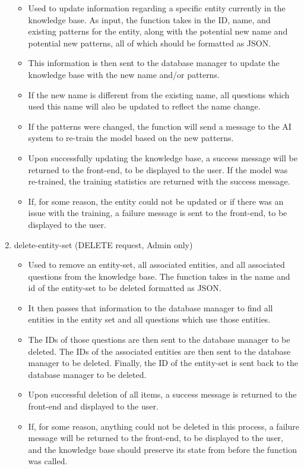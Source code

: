 \documentclass[titlepage, 12pt]{article}
\begin{document}
\begin{enumerate}
    \begin{itemize}
        \item Used to update information regarding a specific entity currently in the knowledge base. As input, the function takes in the ID, name, and existing patterns for the entity, along with the potential new name and potential new patterns, all of which should be formatted as JSON.
        \item This information is then sent to the database manager to update the knowledge base with the new name and/or patterns.
        \item If the new name is different from the existing name, all questions which used this name will also be updated to reflect the name change.
        \item If the patterns were changed, the function will send a message to the AI system to re-train the model based on the new patterns.
        \item Upon successfully updating the knowledge base, a success message will be returned to the front-end, to be displayed to the user. If the model was re-trained, the training statistics are returned with the success message.
        \item If, for some reason, the entity could not be updated or if there was an issue with the training, a failure message is sent to the front-end, to be displayed to the user.
    \end{itemize}
    \item delete-entity-set (DELETE request, Admin only)
    \begin{itemize}
        \item Used to remove an entity-set, all associated entities, and all associated questions from the knowledge base. The function takes in the name and id of the entity-set to be deleted formatted as JSON.
        \item It then passes that information to the database manager to find all entities in the entity set and all questions which use those entities.
        \item The IDs of those questions are then sent to the database manager to be deleted. The IDs of the associated entities are then sent to the database manager to be deleted. Finally, the ID of the entity-set is sent back to the database manager to be deleted.
        \item Upon successful deletion of all items, a success message is returned to the front-end and displayed to the user.
        \item If, for some reason, anything could not be deleted in this process, a failure message will be returned to the front-end, to be displayed to the user, and the knowledge base should preserve its state from before the function was called.

\end{itemize}
\end{enumerate}
\end{document}
